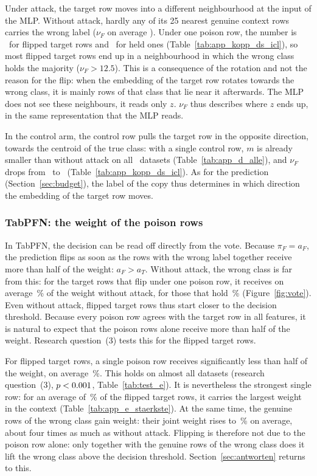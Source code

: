 \documentclass[pdflatex,sn-mathphys-num]{sn-jnl}
\newcommand{\pf}{\pi_F}
\begin{document}
Under attack, the target row moves into a different neighbourhood at the
input of the MLP. Without attack, hardly any of its 25 nearest genuine
context rows carries the wrong label ($\nu_F$ on average
\zKoppICLohneMittel). Under one poison row, the number is
\zKoppICLgekipptMittel\ for flipped target rows and
\zKoppICLgehaltenMittel\ for held ones
(Table~\ref{tab:app_kopp_ds_icl}), so most flipped target rows end up in
a neighbourhood in which the wrong class holds the majority
($\nu_F > 12.5$). This is a consequence of the
rotation and not the reason for the flip: when the embedding of the target row rotates towards the wrong
class, it is mainly rows of that class that lie near it afterwards. The
MLP does not see these neighbours, it reads only $z$. $\nu_F$ thus
describes where $z$ ends up, in the same representation that the MLP
reads.

In the control arm, the control row pulls the target row in the opposite
direction, towards the centroid of the true class: with a single control
row, $m$ is already smaller than without attack on all \zDS\ datasets
(Table~\ref{tab:app_d_alle}), and $\nu_F$ drops from
\zKoppICLohneMittel\ to \zKoppICLkontrMittel\
(Table~\ref{tab:app_kopp_ds_icl}). As for the prediction
(Section~\ref{sec:budget}), the label of the copy thus determines in
which direction the embedding of the target row moves.

\subsubsection{TabPFN: the weight of the poison rows}
\label{sec:pfn}

In TabPFN, the decision can be read off directly from the vote. Because
$\pf = a_F$, the prediction flips as soon as the rows with the wrong
label together receive more than half of the weight: $a_F > a_T$.
Without attack, the wrong class is far from this: for the target rows
that flip under one poison row, it receives on average
\zPFNaFnullGekipptPct\,\% of the weight without attack, for those that
hold \zPFNaFnullGehaltenPct\,\% (Figure~\ref{fig:vote}). Even without
attack, flipped target rows thus start closer to the decision
threshold. Because every
poison row agrees with the target row in all features, it is natural to
expect that the poison rows alone receive more than half of the weight.
Research question~(3) tests this for the flipped target rows.

For flipped target rows, a single poison row receives significantly less
than half of the weight, on average \zPFNgiftEins\,\%. This holds on
almost all datasets (research question~(3), $p < 0.001$,
Table~\ref{tab:test_e}). It is nevertheless the strongest single row: for
an average of \zPFNstaerksteEins\,\% of the flipped target rows, it
carries the largest weight in the context
(Table~\ref{tab:app_e_staerkste}). At the same time, the genuine rows of
the wrong class gain weight: their joint weight rises to
\zPFNechtEins\,\% on average, about four times as much as without attack.
Flipping is therefore not due to the poison row alone: only together with
the genuine rows of the wrong class does it lift the wrong class above the
decision threshold. Section~\ref{sec:antworten} returns to this.
\end{document}
